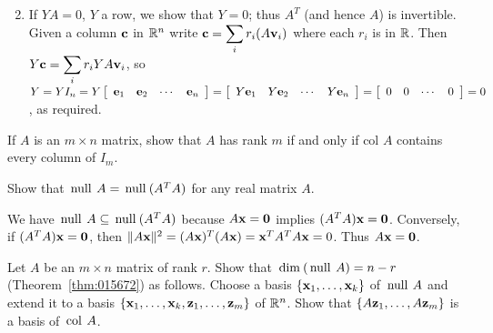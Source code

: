 \begin{multicols}{2}
\begin{supex}
\begin{enumerate}[label={\alph*.}]
\end{enumerate}
\begin{supsol}
\begin{enumerate}[label={\alph*.}]
\setcounter{enumi}{1}
\item  If $YA = 0$, $Y$ a row, we show that $Y = 0$; thus $A^{T}$ (and hence $A$) is invertible. Given a column $\textbf{c}$ in $\mathbb{R}^n$ write $\textbf{c} = \displaystyle \sum_{i}r_i(A\textbf{v}_i)$ where each $r_{i}$ is in $\mathbb{R}$. Then $Y \textbf{c} = \displaystyle \sum_{i}r_iYA\textbf{v}_i$, so $Y = YI_n = Y
\left[ \begin{array}{cccc}
\textbf{e}_1 &
\textbf{e}_2 &
\cdots &
\textbf{e}_n 
\end{array} \right]
= 
\left[ \begin{array}{cccc}
Y\textbf{e}_1 &
Y\textbf{e}_2 &
\cdots &
Y\textbf{e}_n 
\end{array} \right]
= 
\left[ \begin{array}{cccc}
0 & 0 & \cdots & 0
\end{array} \right]
= 0$, as required.

\end{enumerate}
\end{supsol}
\end{supex}

\columnbreak

\begin{supex}
If $A$ is an $m \times n$ matrix, show that $A$ has rank $m$ if and only if col $A$ contains every column of $I_{m}$.

\end{supex}

\begin{supex}
Show that $\thinspace\operatorname{null\medspace} A = \thinspace\operatorname{null\medspace}(A^{T}A)$ for any real matrix $A$.

\begin{supsol}
We have $\thinspace\operatorname{null\medspace} A \subseteq \thinspace\operatorname{null\medspace}(A^{T}A)$ because $A\textbf{x} = \textbf{0}$ implies $(A^{T}A)\textbf{x} = \textbf{0}$. Conversely, if $(A^{T}A)\textbf{x} = \textbf{0}$, then $\| A\textbf{x}\|^{2} = (A\textbf{x})^{T}(A\textbf{x}) = \textbf{x}^{T}A^{T}A\textbf{x} = 0$. Thus $A\textbf{x} = \textbf{0}$.

\end{supsol}
\end{supex}

\begin{supex}
Let $A$ be an $m \times n$ matrix of rank $r$. Show that $\thinspace\operatorname{dim\medspace}(\thinspace\operatorname{null\medspace} A) = n - r$ (Theorem~\ref{thm:015672}) as follows. Choose a basis $\{\textbf{x}_{1}, \dots, \textbf{x}_{k}\}$ of $\thinspace\operatorname{null\medspace} A$ and extend it to a basis $\{\textbf{x}_{1}, \dots, \textbf{x}_{k}, \textbf{z}_{1}, \dots, \textbf{z}_{m}\}$ of $\mathbb{R}^n$. Show that $\{A\textbf{z}_{1}, \dots, A\textbf{z}_{m}\}$ is a basis of $\thinspace\operatorname{col\medspace} A$.

\end{supex}
\end{multicols}
